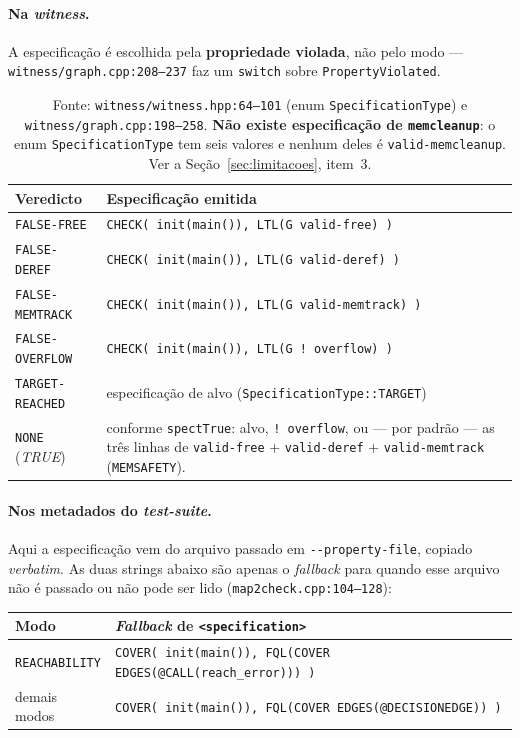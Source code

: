 \documentclass[11pt,a4paper]{article}
\newcommand{\code}[1]{\texttt{#1}}
\newcommand{\flag}[1]{\texttt{-\/-#1}}
\newcommand{\src}[1]{{\small\texttt{#1}}}
\begin{document}
\paragraph{Na \emph{witness}.} A especificação é escolhida pela
\textbf{propriedade violada}, não pelo modo --- \src{witness/graph.cpp:208--237}
faz um \code{switch} sobre \code{PropertyViolated}.

\begin{table}[H]
\centering
\small
\begin{tabularx}{\textwidth}{@{}L{3.6cm} Y@{}}
\toprule
\textbf{Veredicto} & \textbf{Especificação emitida} \\
\midrule
\code{FALSE-FREE}     & \code{CHECK( init(main()), LTL(G valid-free) )} \\
\code{FALSE-DEREF}    & \code{CHECK( init(main()), LTL(G valid-deref) )} \\
\code{FALSE-MEMTRACK} & \code{CHECK( init(main()), LTL(G valid-memtrack) )} \\
\code{FALSE-OVERFLOW} & \code{CHECK( init(main()), LTL(G ! overflow) )} \\
\code{TARGET-REACHED} & especificação de alvo (\code{SpecificationType::TARGET}) \\
\addlinespace
\code{NONE} (\emph{TRUE}) & conforme \code{spectTrue}: alvo, \code{! overflow},
ou --- por padrão --- as três linhas de \code{valid-free} $+$
\code{valid-deref} $+$ \code{valid-memtrack} (\code{MEMSAFETY}). \\
\bottomrule
\end{tabularx}
\caption{Fonte: \src{witness/witness.hpp:64--101} (enum
\code{SpecificationType}) e \src{witness/graph.cpp:198--258}.
\textbf{Não existe especificação de \code{memcleanup}}: o enum
\code{SpecificationType} tem seis valores e nenhum deles é
\code{valid-memcleanup}. Ver a Seção~\ref{sec:limitacoes}, item~3.}
\end{table}

\paragraph{Nos metadados do \emph{test-suite}.} Aqui a especificação vem do
arquivo passado em \flag{property-file}, copiado \emph{verbatim}. As duas
strings abaixo são apenas o \emph{fallback} para quando esse arquivo não é
passado ou não pode ser lido (\src{map2check.cpp:104--128}):

\begin{table}[H]
\centering
\small
\begin{tabularx}{\textwidth}{@{}L{3.6cm} Y@{}}
\toprule
\textbf{Modo} & \textbf{\emph{Fallback} de \code{<specification>}} \\
\midrule
\code{REACHABILITY} &
\code{COVER( init(main()), FQL(COVER EDGES(@CALL(reach\_error))) )} \\
\addlinespace
demais modos &
\code{COVER( init(main()), FQL(COVER EDGES(@DECISIONEDGE)) )} \\
\bottomrule
\end{tabularx}
\end{table}
\end{document}
